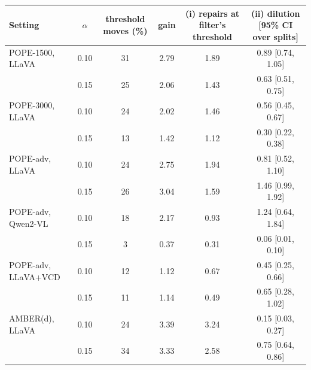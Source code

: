 \begin{tabular}{lccccc}
\toprule
Setting & $\alpha$ & threshold moves (\%) & gain & (i) repairs at filter's threshold & (ii) dilution [95\% CI over splits]\\
\midrule
POPE-1500, LLaVA & 0.10 & 31 & 2.79 & 1.89 & 0.89 [0.74, 1.05]\\
 & 0.15 & 25 & 2.06 & 1.43 & 0.63 [0.51, 0.75]\\
\addlinespace
POPE-3000, LLaVA & 0.10 & 24 & 2.02 & 1.46 & 0.56 [0.45, 0.67]\\
 & 0.15 & 13 & 1.42 & 1.12 & 0.30 [0.22, 0.38]\\
\addlinespace
POPE-adv, LLaVA & 0.10 & 24 & 2.75 & 1.94 & 0.81 [0.52, 1.10]\\
 & 0.15 & 26 & 3.04 & 1.59 & 1.46 [0.99, 1.92]\\
\addlinespace
POPE-adv, Qwen2-VL & 0.10 & 18 & 2.17 & 0.93 & 1.24 [0.64, 1.84]\\
 & 0.15 & 3 & 0.37 & 0.31 & 0.06 [0.01, 0.10]\\
\addlinespace
POPE-adv, LLaVA+VCD & 0.10 & 12 & 1.12 & 0.67 & 0.45 [0.25, 0.66]\\
 & 0.15 & 11 & 1.14 & 0.49 & 0.65 [0.28, 1.02]\\
\addlinespace
AMBER(d), LLaVA & 0.10 & 24 & 3.39 & 3.24 & 0.15 [0.03, 0.27]\\
 & 0.15 & 34 & 3.33 & 2.58 & 0.75 [0.64, 0.86]\\
\bottomrule
\end{tabular}
